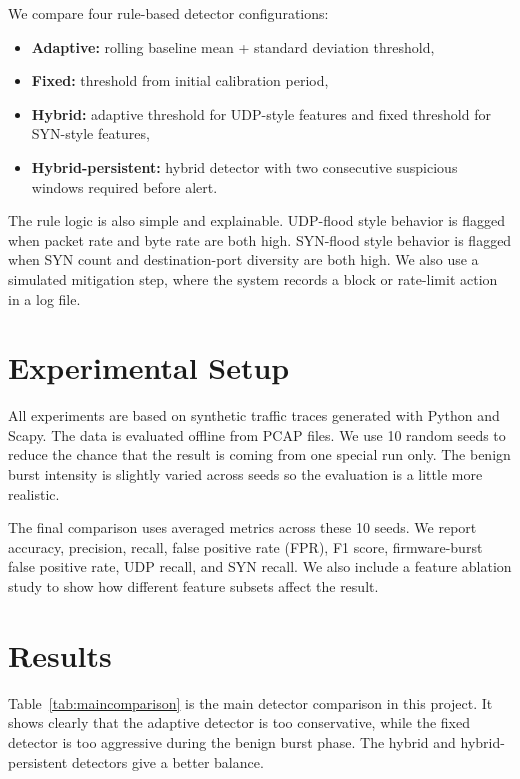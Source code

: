 \documentclass[11pt]{article}
\begin{document}
We compare four rule-based detector configurations:
\begin{itemize}
  \item \textbf{Adaptive:} rolling baseline mean + standard deviation threshold,
  \item \textbf{Fixed:} threshold from initial calibration period,
  \item \textbf{Hybrid:} adaptive threshold for UDP-style features and fixed threshold for SYN-style features,
  \item \textbf{Hybrid-persistent:} hybrid detector with two consecutive suspicious windows required before alert.
\end{itemize}

The rule logic is also simple and explainable. UDP-flood style behavior is flagged when packet
rate and byte rate are both high. SYN-flood style behavior is flagged when SYN count and
destination-port diversity are both high. We also use a simulated mitigation step, where the
system records a block or rate-limit action in a log file.

\section*{Experimental Setup}
All experiments are based on synthetic traffic traces generated with Python and Scapy. The data is
evaluated offline from PCAP files. We use 10 random seeds to reduce the chance that the result is
coming from one special run only. The benign burst intensity is slightly varied across seeds so the
evaluation is a little more realistic.

The final comparison uses averaged metrics across these 10 seeds. We report accuracy, precision,
recall, false positive rate (FPR), F1 score, firmware-burst false positive rate, UDP recall, and
SYN recall. We also include a feature ablation study to show how different feature subsets affect
the result.

\section*{Results}
Table~\ref{tab:maincomparison} is the main detector comparison in this project. It shows clearly
that the adaptive detector is too conservative, while the fixed detector is too aggressive during
the benign burst phase. The hybrid and hybrid-persistent detectors give a better balance.
\end{document}
